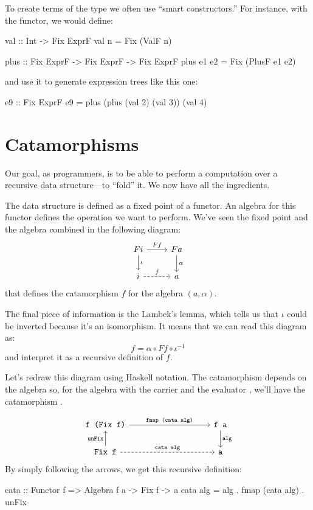 \documentclass[DaoFP]{subfiles}
\begin{document}
To create terms of the type  we often use ``smart constructors.'' For instance, with the  functor, we would define:
\begin{haskell}
val :: Int -> Fix ExprF
val n = Fix (ValF n)

plus :: Fix ExprF -> Fix ExprF -> Fix ExprF
plus e1 e2 = Fix (PlusF e1 e2)
\end{haskell}
and use it to generate expression trees like this one:
\begin{haskell}
e9 :: Fix ExprF
e9 = plus (plus (val 2) (val 3)) (val 4)
\end{haskell}

\section{Catamorphisms}

Our goal, as programmers, is to be able to perform a computation over a recursive data structure---to ``fold'' it. We now have all the ingredients. 

The data structure is defined as a fixed point of a functor. An algebra for this functor defines the operation we want to perform. We've seen the fixed point and the algebra combined in the following diagram:
\[
 \begin{tikzcd}
 F i 
 \arrow[r, "F f"]
 \arrow[d, "\iota"]
 & F a
\arrow[d, "\alpha"]
 \\
 i
 \arrow[r, dashed, "f"]
 & a
  \end{tikzcd}
\]
that defines the catamorphism $f$ for the algebra $(a, \alpha)$.

The final piece of information is the Lambek's lemma, which tells us that $\iota$ could be inverted because it's an isomorphism. It means that we can read this diagram as:
\[ f = \alpha \circ F f \circ \iota^{-1} \]
and interpret it as a recursive definition of $f$. 

Let's redraw this diagram using Haskell notation. The catamorphism depends on the algebra so, for the algebra with the carrier  and the evaluator , we'll have the catamorphism .

\[
 \begin{tikzcd}
  \hask{f (Fix f)}
 \arrow[rrrr, "\hask{fmap (cata alg)}"]
 &&&& \hask{f a}
\arrow[d, "\hask{alg}"]
 \\
 \hask{Fix f}
 \arrow[u, "\hask{unFix}"]
 \arrow[rrrr, dashed, "\hask{cata alg}"]
 &&&& \hask{a}
  \end{tikzcd}
\]
By simply following the arrows, we get this recursive definition:
\begin{haskell}
cata :: Functor f => Algebra f a -> Fix f -> a
cata alg = alg . fmap (cata alg) . unFix
\end{haskell}
\end{document}
